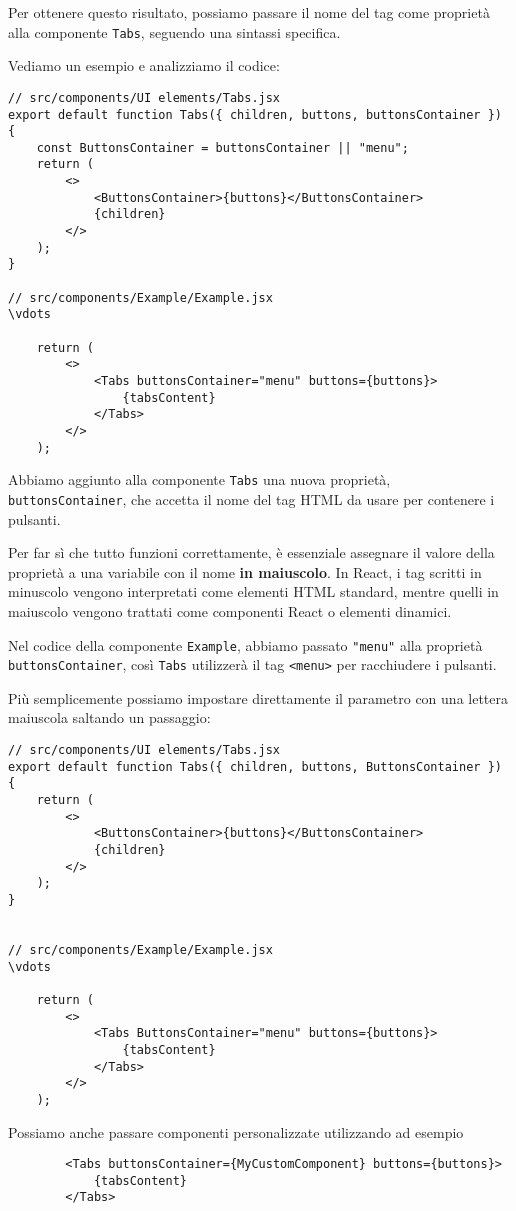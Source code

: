 \documentclass[12pt]{article}
\begin{document}
Per ottenere questo risultato, possiamo passare il nome del tag 
come proprietà alla componente \texttt{Tabs}, seguendo una 
sintassi specifica.

Vediamo un esempio e analizziamo il codice:

\begin{verbatim}
// src/components/UI elements/Tabs.jsx
export default function Tabs({ children, buttons, buttonsContainer }) {
    const ButtonsContainer = buttonsContainer || "menu";
    return (
        <>
            <ButtonsContainer>{buttons}</ButtonsContainer>
            {children}
        </>
    );
}

// src/components/Example/Example.jsx
\vdots

    return (
        <>
            <Tabs buttonsContainer="menu" buttons={buttons}>
                {tabsContent}
            </Tabs>
        </>
    );
\end{verbatim}

Abbiamo aggiunto alla componente \texttt{Tabs} una nuova 
proprietà, \texttt{buttonsContainer}, che accetta il nome del 
tag HTML da usare per contenere i pulsanti.  

Per far sì che tutto funzioni correttamente, è essenziale 
assegnare il valore della proprietà a una variabile con il nome 
\textbf{in maiuscolo}. In React, i tag scritti in minuscolo vengono 
interpretati come elementi HTML standard, mentre quelli in 
maiuscolo vengono trattati come componenti React o elementi 
dinamici.

Nel codice della componente \texttt{Example}, abbiamo passato 
\texttt{"menu"} alla proprietà \texttt{buttonsContainer}, così 
\texttt{Tabs} utilizzerà il tag \texttt{<menu>} per racchiudere 
i pulsanti.

Più semplicemente possiamo impostare direttamente il parametro con 
una lettera maiuscola saltando un passaggio:
\begin{verbatim}
// src/components/UI elements/Tabs.jsx
export default function Tabs({ children, buttons, ButtonsContainer }) {
    return (
        <>
            <ButtonsContainer>{buttons}</ButtonsContainer>
            {children}
        </>
    );
}


// src/components/Example/Example.jsx
\vdots

    return (
        <>
            <Tabs ButtonsContainer="menu" buttons={buttons}>
                {tabsContent}
            </Tabs>
        </>
    );

\end{verbatim}

\begin{highlight}
    Possiamo anche passare componenti personalizzate utilizzando
    ad esempio 
    \begin{verbatim}
        <Tabs buttonsContainer={MyCustomComponent} buttons={buttons}>
            {tabsContent}
        </Tabs>
    \end{verbatim}
\end{highlight}
\end{document}
